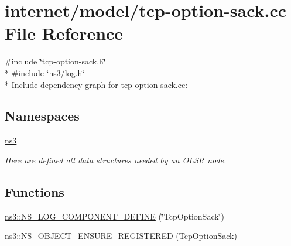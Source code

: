 \hypertarget{tcp-option-sack_8cc}{}\section{internet/model/tcp-\/option-\/sack.cc File Reference}
\label{tcp-option-sack_8cc}
{\ttfamily \#include \char`\"{}tcp-\/option-\/sack.\+h\char`\"{}}\\*
{\ttfamily \#include \char`\"{}ns3/log.\+h\char`\"{}}\\*
Include dependency graph for tcp-\/option-\/sack.cc\+:
\subsection*{Namespaces}
\begin{DoxyCompactItemize}
\item 
 \hyperlink{namespacens3}{ns3}
\begin{DoxyCompactList}\small\item\em Here are defined all data structures needed by an O\+L\+SR node. \end{DoxyCompactList}\end{DoxyCompactItemize}
\subsection*{Functions}
\begin{DoxyCompactItemize}
\item 
\hyperlink{namespacens3_ac448f2da374d2221d6b8b2c0d2ba887f}{ns3\+::\+N\+S\+\_\+\+L\+O\+G\+\_\+\+C\+O\+M\+P\+O\+N\+E\+N\+T\+\_\+\+D\+E\+F\+I\+NE} (\char`\"{}Tcp\+Option\+Sack\char`\"{})
\item 
\hyperlink{namespacens3_a7f96a5348a9748c403155c70c9c6d9d1}{ns3\+::\+N\+S\+\_\+\+O\+B\+J\+E\+C\+T\+\_\+\+E\+N\+S\+U\+R\+E\+\_\+\+R\+E\+G\+I\+S\+T\+E\+R\+ED} (Tcp\+Option\+Sack)
\end{DoxyCompactItemize}
